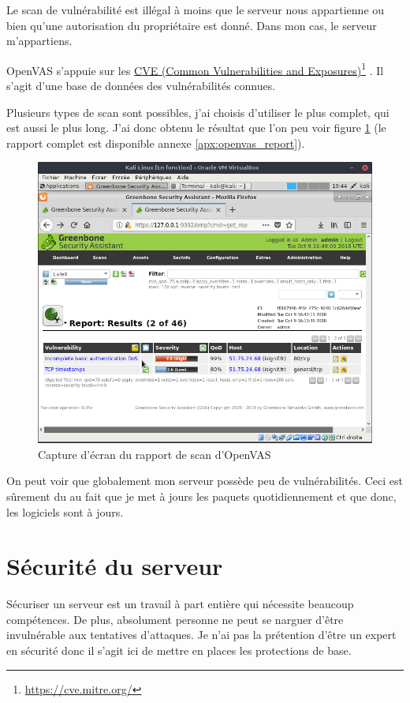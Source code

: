 \documentclass[]{report}
\newcommand\fnurl[2]{%
  \href{#1}{#2}\footnote{\url{#1}}%
}
\begin{document}
      Le scan de vulnérabilité est illégal à moins que le serveur nous appartienne ou bien qu'une autorisation du propriétaire est donné. Dans mon cas, le serveur m’appartiens.

      OpenVAS s'appuie sur les \fnurl{https://cve.mitre.org/}{CVE (Common Vulnerabilities and Exposures)}. Il s'agit d'une base de données des vulnérabilités connues.

      Plusieurs types de scan sont possibles, j'ai choisis d'utiliser le plus complet, qui est aussi le plus long. J'ai donc obtenu le résultat que l'on peu voir figure \ref{fig:openvas_report} (le rapport complet est disponible annexe \ref{apx:openvas_report}).

      \begin{figure}
        \includegraphics[width=\linewidth]{img/kali_openvas_report.png}
        \caption{Capture d'écran du rapport de scan d'OpenVAS}
        \label{fig:openvas_report}
      \end{figure}

      On peut voir que globalement mon serveur possède peu de vulnérabilités. Ceci est sûrement du au fait que je met à jours les paquets quotidiennement et que donc, les logiciels sont à jours.


  \section{Sécurité du serveur}

    Sécuriser un serveur est un travail à part entière qui nécessite beaucoup compétences. De plus, absolument personne ne peut se narguer d'être invulnérable aux tentatives d'attaques. Je n'ai pas la prétention d'être un expert en sécurité donc il s'agit ici de mettre en places les protections de base.
\end{document}
